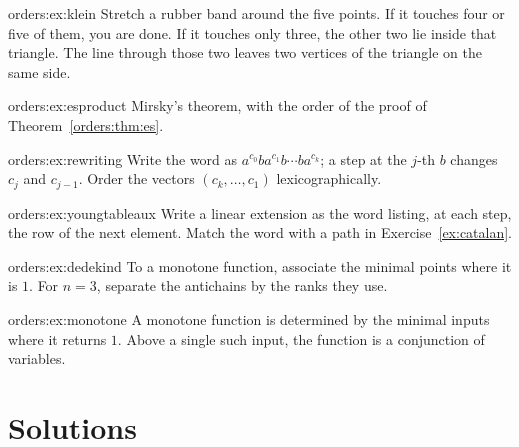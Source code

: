 \begin{hint}{orders:ex:klein}
Stretch a rubber band around the five points. If it touches four or five of them, you are done. If it touches only three, the other two lie inside that triangle. The line through those two leaves two vertices of the triangle on the same side.
\end{hint}
\begin{hint}{orders:ex:esproduct}
Mirsky's theorem, with the order of the proof of Theorem~\ref{orders:thm:es}.
\end{hint}
\begin{hint}{orders:ex:rewriting}
Write the word as $a^{c_0}ba^{c_1}b\cdots ba^{c_k}$; a step at the $j$-th $b$ changes $c_j$ and $c_{j-1}$. Order the vectors $(c_k,\dots,c_1)$ lexicographically.
\end{hint}
\begin{hint}{orders:ex:youngtableaux}
Write a linear extension as the word listing, at each step, the row of the next element. Match the word with a path in Exercise~\ref{ex:catalan}.
\end{hint}
\begin{hint}{orders:ex:dedekind}
To a monotone function, associate the minimal points where it is $1$. For $n=3$, separate the antichains by the ranks they use.
\end{hint}
\begin{hint}{orders:ex:monotone}
A monotone function is determined by the minimal inputs where it returns $1$. Above a single such input, the function is a conjunction of variables.
\end{hint}
\section{Solutions}

